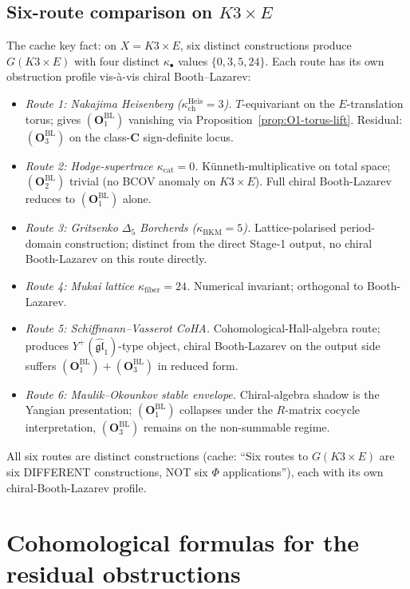 \documentclass[11pt]{amsart}
\newcommand{\kch}{\kappa_{\mathrm{ch}}}
\newcommand{\kcat}{\kappa_{\mathrm{cat}}}
\newcommand{\kBKM}{\kappa_{\mathrm{BKM}}}
\newcommand{\kfib}{\kappa_{\mathrm{fiber}}}
\begin{document}
\subsection{Six-route comparison on $K3\times E$}

The cache key fact: on $X = K3 \times E$, six distinct
constructions produce $G(K3 \times E)$ with four distinct
$\kappa_\bullet$ values $\{0, 3, 5, 24\}$. Each route has its
own obstruction profile vis-\`a-vis chiral Booth--Lazarev:
\begin{itemize}[leftmargin=2em]
\item \emph{Route 1: Nakajima Heisenberg ($\kch^{\mathrm{Heis}} = 3$).}
$T$-equivariant on the $E$-translation torus; gives
$(\mathbf{O}_1^{\mathrm{BL}})$ vanishing via
Proposition~\ref{prop:O1-torus-lift}. Residual: $(\mathbf{O}_3^{\mathrm{BL}})$
on the class-$\mathbf{C}$ sign-definite locus.
\item \emph{Route 2: Hodge-supertrace $\kcat = 0$.}
Künneth-multiplicative on total space;
$(\mathbf{O}_2^{\mathrm{BL}})$ trivial (no BCOV anomaly on
$K3\times E$). Full chiral Booth-Lazarev reduces to
$(\mathbf{O}_1^{\mathrm{BL}})$ alone.
\item \emph{Route 3: Gritsenko $\Delta_5$ Borcherds ($\kBKM = 5$).}
Lattice-polarised period-domain construction; distinct from the
direct Stage-1 output, no chiral Booth-Lazarev on this route
directly.
\item \emph{Route 4: Mukai lattice $\kfib = 24$.}
Numerical invariant; orthogonal to Booth-Lazarev.
\item \emph{Route 5: Schiffmann--Vasserot CoHA.}
Cohomological-Hall-algebra route; produces
$Y^+(\widehat{\mathfrak{gl}}_1)$-type object, chiral Booth-Lazarev
on the output side suffers $(\mathbf{O}_1^{\mathrm{BL}}) +
(\mathbf{O}_3^{\mathrm{BL}})$ in reduced form.
\item \emph{Route 6: Maulik--Okounkov stable envelope.}
Chiral-algebra shadow is the Yangian presentation;
$(\mathbf{O}_1^{\mathrm{BL}})$ collapses under the
$R$-matrix cocycle interpretation, $(\mathbf{O}_3^{\mathrm{BL}})$
remains on the non-summable regime.
\end{itemize}

All six routes are distinct constructions (cache: ``Six routes to
$G(K3 \times E)$ are six DIFFERENT constructions, NOT six $\Phi$
applications''), each with its own chiral-Booth-Lazarev profile.

\section{Cohomological formulas for the residual obstructions}
\label{sec:cohomological-formulas}
\end{document}
